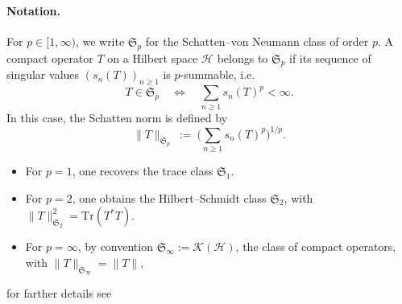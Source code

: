\documentclass[10pt]{amsart}
\newcommand{\1}{{\mathbb{I}}}
\numberwithin{equation}{section}
\begin{document}
\paragraph{Notation.}
For \(p \in [1,\infty)\), we write \(\mathfrak S_p\) for the Schatten--von Neumann class of order \(p\).
A compact operator \(T\) on a Hilbert space \(\mathcal H\) belongs to \(\mathfrak S_p\) if its sequence of singular values \((s_n(T))_{n\ge 1}\) is \(p\)-summable, i.e.
\[
   T \in \mathfrak S_p
   \quad \Longleftrightarrow \quad
   \sum_{n\ge 1} s_n(T)^p < \infty .
\]
In this case, the Schatten norm is defined by
\[
   \|T\|_{\mathfrak S_p} \ :=\ \Big( \sum_{n\ge 1} s_n(T)^p \Big)^{1/p}.
\]
\begin{itemize}
  \item For \(p=1\), one recovers the trace class \(\mathfrak S_1\).
  \item For \(p=2\), one obtains the Hilbert--Schmidt class \(\mathfrak S_2\), with
  \(\|T\|_{\mathfrak S_2}^2 = \mathrm{Tr}(T^*T)\).
  \item For \(p=\infty\), by convention \(\mathfrak S_\infty := \mathcal K(\mathcal H)\), the class of compact operators, with \(\|T\|_{\mathfrak S_\infty} = \|T\|\),
\end{itemize}
for farther details see \cite{WongSchatten, PhamSchatten,AthmouniPurice-CPDE-2018}
\end{document}

